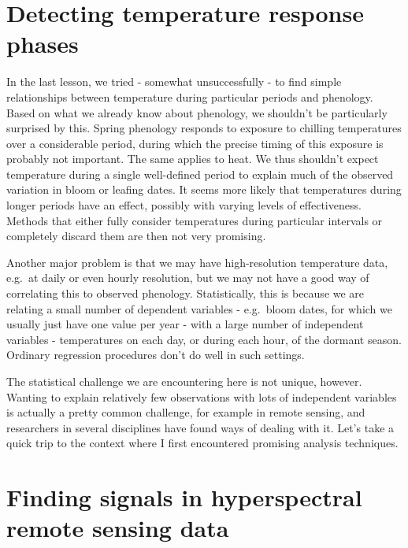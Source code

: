 \documentclass[
]{book}
\begin{document}
\hypertarget{detecting-temperature-response-phases}{%
\section{Detecting temperature response phases}\label{detecting-temperature-response-phases}}

In the last lesson, we tried - somewhat unsuccessfully - to find simple relationships between temperature during particular periods and phenology. Based on what we already know about phenology, we shouldn't be particularly surprised by this. Spring phenology responds to exposure to chilling temperatures over a considerable period, during which the precise timing of this exposure is probably not important. The same applies to heat. We thus shouldn't expect temperature during a single well-defined period to explain much of the observed variation in bloom or leafing dates. It seems more likely that temperatures during longer periods have an effect, possibly with varying levels of effectiveness. Methods that either fully consider temperatures during particular intervals or completely discard them are then not very promising.

Another major problem is that we may have high-resolution temperature data, e.g.~at daily or even hourly resolution, but we may not have a good way of correlating this to observed phenology. Statistically, this is because we are relating a small number of dependent variables - e.g.~bloom dates, for which we usually just have one value per year - with a large number of independent variables - temperatures on each day, or during each hour, of the dormant season. Ordinary regression procedures don't do well in such settings.

The statistical challenge we are encountering here is not unique, however. Wanting to explain relatively few observations with lots of independent variables is actually a pretty common challenge, for example in remote sensing, and researchers in several disciplines have found ways of dealing with it. Let's take a quick trip to the context where I first encountered promising analysis techniques.

\hypertarget{finding-signals-in-hyperspectral-remote-sensing-data}{%
\section{Finding signals in hyperspectral remote sensing data}\label{finding-signals-in-hyperspectral-remote-sensing-data}}
\end{document}
